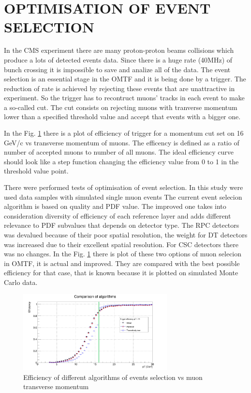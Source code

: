 \section{OPTIMISATION OF EVENT SELECTION}  

In the CMS experiment there are many proton-proton beams collisions which produce a lots of detected events data.
Since there is a huge rate (40MHz) of bunch crossing it is impossible to save and analize all of the data.
The event selection is an essential stage in the OMTF and it is being done by a trigger.
The reduction of rate is achieved by rejecting these events that are unattractive in experiment.
So the trigger has to recontruct muons' tracks in each event to make a so-called cut.
The cut consists on rejecting muons with tranverse momentum lower than a specified threshold value and accept that events with a bigger one.

In the Fig. \ref{eff} there is a plot of efficiency of trigger for a momentum cut set on 16 GeV/c vs transverse momentum of muons.
The efficency is defined as a ratio of number of accepted muons to number of all muons.
The ideal efficiency curve should look like a step function changing the efficiency value from 0 to 1 in the threshold value point.

There were performed tests of optimisation of event selection.
In this study were used data samples with simulated single muon events
The current event selecion algorithm is based on quality and PDF value.
The improved one takes into consideration diversity of efficiency of each reference layer and adds different relevance to PDF subvalues that depends on detector type.
The RPC detectors was devalued because of their poor spatial resolution, the weight for DT detectors was increased due to their excellent spatial resolution.
For CSC detectors there was no changes.
In the Fig. \ref{eff} there is plot of these two options of muon selecion in OMTF, it is actual and improved.
They are compared with the best possible efficiency for that case, that is known because it is plotted on simulated Monte Carlo data.

\begin{figure}[ht]
\centering
\includegraphics[width=0.7\textwidth]{Hist16.png}
\caption{Efficiency of different algorithms of events selection vs muon transverse momentum}
\label{eff}
\end{figure} 

